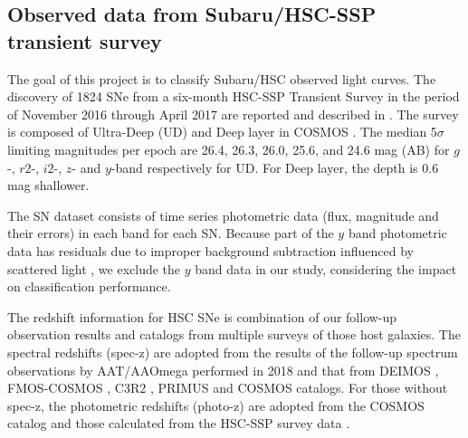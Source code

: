 \documentclass[proof]{pasj01}
\begin{document}
\subsection{Observed data from Subaru/HSC-SSP transient survey}
\label{sec:hscdata}
The goal of this project is to classify Subaru/HSC observed light curves. 
The discovery of 1824 SNe from a six-month HSC-SSP Transient Survey in the period of
November 2016 through April 2017 are reported and described in \citet{yasuda19a}.
The survey is composed of Ultra-Deep (UD) and Deep layer in COSMOS \citep{scoville07a}.
The median 5$\sigma$ limiting magnitudes per epoch are 26.4, 26.3, 26.0, 25.6, and 24.6 mag (AB)
for $g$-, $r2$-, $i2$-, $z$- and $y$-band respectively for UD. 
For Deep layer, the depth is 0.6 mag shallower.

The SN dataset consists of time series photometric data (flux, magnitude and their errors) in each band for each SN.
Because part of the $y$ band photometric data has residuals due to improper background subtraction influenced by scattered light \citep{aihara18dr},
we exclude the $y$ band data in our study, considering the impact on classification performance.

The redshift information for HSC SNe is combination of our follow-up observation results and catalogs from multiple surveys of those host galaxies.
The spectral redshifts (spec-z) are adopted from the results of the follow-up spectrum observations by AAT/AAOmega performed in 2018 and that from DEIMOS \citep{DEIMOS2018}, FMOS-COSMOS \citep{FMOS-COSMOS2015}, C3R2 \citep{C3R2_2017}, PRIMUS \citep{PRIMUS2011} and COSMOS catalogs.
For those without spec-z, the photometric redshifts (photo-z) are adopted from the COSMOS catalog and those calculated from the HSC-SSP survey data \citep{HSCSSP_photo-z2018}.
\end{document}

